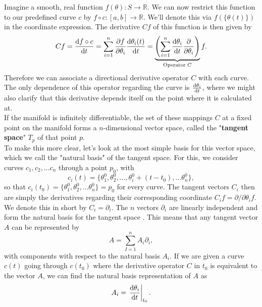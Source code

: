 Imagine a smooth, real function $f(\theta): S \rightarrow \mathbb{R}$. We can now restrict this function to our predefined curve $c$ by $f \circ c : [a,b] \rightarrow \mathbb{R}$. We'll denote this via $f\left(\{\theta(t)\}\right)$ in the coordinate expression. The derivative $Cf$ of this function is then given by \cite{AmarisLectureNotes}
\begin{equation}
	Cf = \frac{\mathrm{d}f\circ c}{\mathrm{d}t} = \sum_{i=1}^{n} \frac{\partial f}{\partial\theta_i}\frac{\mathrm{d}\theta_i(t)}{\mathrm{d}t} = \underbrace{\left(\sum_{i=1}^{n}\frac{\mathrm{d}\theta_i}{\mathrm{d}t}\frac{\partial}{\partial\theta_i}\right)}_{\text{Operator }C} f.
\end{equation}
Therefore we can associate a directional derivative operator $C$ with each curve. The only dependence of this operator regarding the curve is $\frac{\mathrm{d}\theta_i}{\mathrm{d}t}$, where we might also clarify that this derivative depends itself on the point where it is calculated at.\\
If the manifold is infinitely differentiable, the set of these mappings $C$ at a fixed point on the manifold forms a $n$-dimensional vector space, called the "\textbf{tangent space}" $T_p$ of that point $p$. \\
To make this more clear, let's look at the most simple basis for this vector space, which we call the "natural basis" of the tangent space. For this, we consider curves $c_1,c_2, \dotsc c_n$ through a point $p_0$, with
\begin{equation}
	c_i(t) = \{\theta_1^0,\theta_2^0, \dotsc, \theta_i^0 + (t-t_0), \dotsc \theta_n^0 \},
\end{equation}
so that $c_i(t_0) = \{\theta_1^0,\theta_2^0, \dotsc\theta_n^0\} = p_0$ for every curve. The tangent vectors $C_i$ then are simply the derivatives regarding their corresponding coordinate $C_i f = \partial/\partial \theta_i f$. We denote this in short by $C_i = \partial_i$. The $n$ vectors $\partial_i$ are linearly independent and form the natural basis for the tangent space \cite{AmarisLectureNotes} . This means that any tangent vector $A$ can be represented by \cite{AmarisLectureNotes} 
\begin{equation}
	A = \sum_{I=1}^{n} A_i \partial_i,
\end{equation}
with components with respect to the natural basis $A_i$. If we are given a curve $c(t)$ going through $c(t_0)$ where the derivative operator $C$ in $t_0$ is equivalent to the vector $A$, we can find the natural basis representation of $A$ as \cite{AmarisLectureNotes}
\begin{equation}
	A_i = \left. \frac{\mathrm{d}\theta_i}{\mathrm{d}t}\right|_{t_0}.
\end{equation} \\
